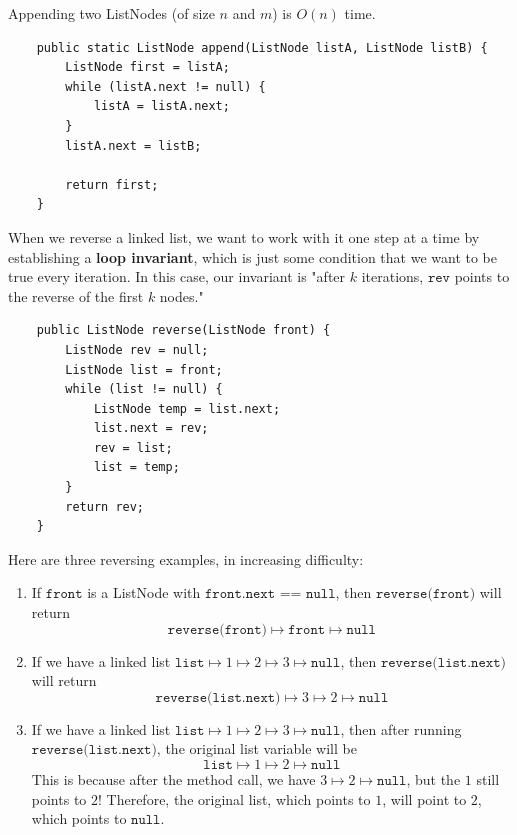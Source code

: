 \documentclass{article}
\begin{document}
    \begin{theorem}[Appending]
    Appending two ListNodes (of size $n$ and $m$) is $O(n)$ time.
    \begin{lstlisting}
    public static ListNode append(ListNode listA, ListNode listB) {
        ListNode first = listA; 
        while (listA.next != null) {
            listA = listA.next; 
        }
        listA.next = listB; 
        
        return first; 
    }
    \end{lstlisting}
    \end{theorem}

    \begin{theorem}[Reversing]
    When we reverse a linked list, we want to work with it one step at a time by establishing a \textbf{loop invariant}, which is just some condition that we want to be true every iteration. In this case, our invariant is "after $k$ iterations, $\texttt{rev}$ points to the reverse of the first $k$ nodes." 
    \begin{lstlisting}
    public ListNode reverse(ListNode front) {
        ListNode rev = null; 
        ListNode list = front; 
        while (list != null) {
            ListNode temp = list.next; 
            list.next = rev; 
            rev = list; 
            list = temp; 
        }
        return rev; 
    }
    \end{lstlisting}
    \end{theorem}

    \begin{example}
    Here are three reversing examples, in increasing difficulty: 
    \begin{enumerate}
        \item If $\texttt{front}$ is a ListNode with $\texttt{front.next == null}$, then $\texttt{reverse(front)}$ will return 
        \[\texttt{reverse(front)} \mapsto \texttt{front} \mapsto \texttt{null}\]
        \item If we have a linked list $\texttt{list} \mapsto 1 \mapsto 2 \mapsto 3 \mapsto \texttt{null}$, then $\texttt{reverse(list.next)}$ will return 
        \[\texttt{reverse(list.next)} \mapsto 3 \mapsto 2 \mapsto \texttt{null} \]
        \item If we have a linked list $\texttt{list} \mapsto 1 \mapsto 2 \mapsto 3 \mapsto \texttt{null}$, then after running $\texttt{reverse(list.next)}$, the original list variable will be 
        \[\texttt{list} \mapsto 1 \mapsto 2 \mapsto \texttt{null}\]
        This is because after the method call, we have $3 \mapsto 2 \mapsto \texttt{null}$, but the $1$ still points to $2$! Therefore, the original list, which points to $1$, will point to $2$, which points to $\texttt{null}$. 
    \end{enumerate}
    \end{example}
\end{document}
